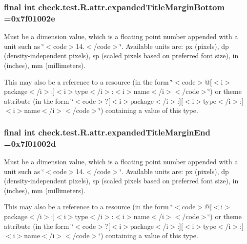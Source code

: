 \subsubsection[{expanded\+Title\+Margin\+Bottom}]{\setlength{\rightskip}{0pt plus 5cm}final int check.\+test.\+R.\+attr.\+expanded\+Title\+Margin\+Bottom =0x7f01002e\hspace{0.3cm}{\ttfamily [static]}}\label{classcheck_1_1test_1_1_r_1_1attr_aecfd01acd4ec8625740c74f45afd13a6}
Must be a dimension value, which is a floating point number appended with a unit such as \char`\"{}$<$code$>$14.\+5sp$<$/code$>$\char`\"{}. Available units are\+: px (pixels), dp (density-\/independent pixels), sp (scaled pixels based on preferred font size), in (inches), mm (millimeters). 

This may also be a reference to a resource (in the form \char`\"{}$<$code$>$@\mbox{[}$<$i$>$package$<$/i$>$\+:\mbox{]}$<$i$>$type$<$/i$>$\+:$<$i$>$name$<$/i$>$$<$/code$>$\char`\"{}) or theme attribute (in the form \char`\"{}$<$code$>$?\mbox{[}$<$i$>$package$<$/i$>$\+:\mbox{]}\mbox{[}$<$i$>$type$<$/i$>$\+:\mbox{]}$<$i$>$name$<$/i$>$$<$/code$>$\char`\"{}) containing a value of this type. \hypertarget{classcheck_1_1test_1_1_r_1_1attr_ac3625e75ee780dbfcc80b6559140ef24}{}
\subsubsection[{expanded\+Title\+Margin\+End}]{\setlength{\rightskip}{0pt plus 5cm}final int check.\+test.\+R.\+attr.\+expanded\+Title\+Margin\+End =0x7f01002d\hspace{0.3cm}{\ttfamily [static]}}\label{classcheck_1_1test_1_1_r_1_1attr_ac3625e75ee780dbfcc80b6559140ef24}
Must be a dimension value, which is a floating point number appended with a unit such as \char`\"{}$<$code$>$14.\+5sp$<$/code$>$\char`\"{}. Available units are\+: px (pixels), dp (density-\/independent pixels), sp (scaled pixels based on preferred font size), in (inches), mm (millimeters). 

This may also be a reference to a resource (in the form \char`\"{}$<$code$>$@\mbox{[}$<$i$>$package$<$/i$>$\+:\mbox{]}$<$i$>$type$<$/i$>$\+:$<$i$>$name$<$/i$>$$<$/code$>$\char`\"{}) or theme attribute (in the form \char`\"{}$<$code$>$?\mbox{[}$<$i$>$package$<$/i$>$\+:\mbox{]}\mbox{[}$<$i$>$type$<$/i$>$\+:\mbox{]}$<$i$>$name$<$/i$>$$<$/code$>$\char`\"{}) containing a value of this type. \hypertarget{classcheck_1_1test_1_1_r_1_1attr_a9e33e552c74573d94aec9c48307e0e40}{}
